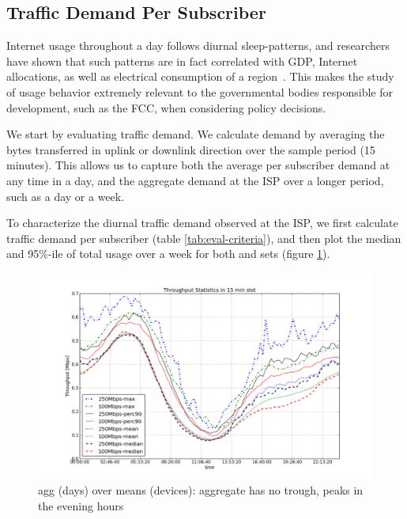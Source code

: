 \subsection{Traffic Demand Per Subscriber}\label{subsec:behavior}

Internet usage throughout a day follows diurnal sleep-patterns, and researchers
have shown that such patterns are in fact correlated with GDP, Internet 
allocations, as well as electrical consumption of 
a region~\cite{ant-diurnal-web}. This makes the study of usage behavior 
extremely relevant to the governmental bodies responsible
for development, such as the FCC, when considering policy decisions.

We start by evaluating traffic demand. We calculate demand by averaging the 
bytes transferred in uplink or downlink direction over the sample period (15 
minutes). This allows us to capture both the average per subscriber demand at 
any time in a day, and the aggregate demand at the ISP over a longer period, 
such as a day or a week.

To characterize the diurnal traffic demand observed at the ISP, we first 
calculate traffic demand per subscriber (table \ref{tab:eval-criteria}), and 
then plot the median and 95\%-ile of total usage over a week for both 
\treatment{} and \control{} sets (figure \ref{fig:TS-data-rate-daily}).

\begin{figure}[ht]
\begin{minipage}{\linewidth}
  \centering
  \includegraphics[width=\linewidth]{figures/describe-total-throughput-per-day[replace].png}
  \caption{agg (days) over means (devices): aggregate has no trough, peaks in the evening hours}
  \label{fig:TS-data-rate-daily}
\end{minipage}
\end{figure}

